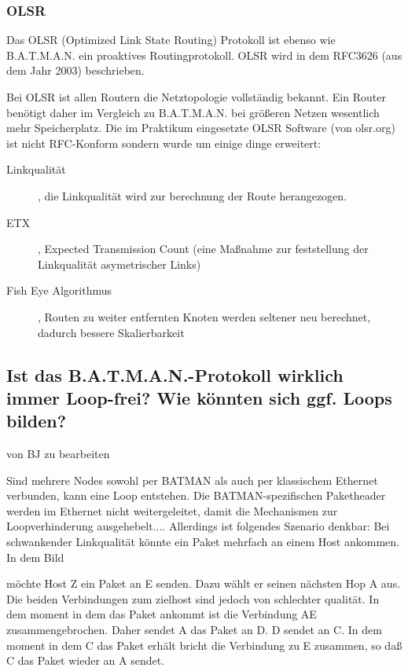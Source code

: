 \documentclass[a4paper,10pt]{article}
\begin{document}

\subsubsection*{OLSR}
Das OLSR (Optimized Link State Routing) Protokoll ist ebenso wie B.A.T.M.A.N. ein proaktives Routingprotokoll.
OLSR wird in dem RFC3626 (aus dem Jahr 2003) beschrieben.

Bei OLSR ist allen Routern die Netztopologie vollständig bekannt. Ein Router benötigt daher im Vergleich zu B.A.T.M.A.N. bei größeren
Netzen wesentlich mehr Speicherplatz.
Die im Praktikum eingesetzte OLSR Software (von olsr.org) ist nicht RFC-Konform sondern wurde um einige dinge erweitert:

\begin{description}
\item[Linkqualität], die Linkqualität wird zur berechnung der Route herangezogen.
\item[ETX], Expected Transmission Count (eine Maßnahme zur feststellung der Linkqualität asymetrischer Links)
\item[Fish Eye Algorithmus], Routen zu weiter entfernten Knoten werden seltener neu berechnet, dadurch bessere Skalierbarkeit
\end{description}

\subsection{Ist das B.A.T.M.A.N.-Protokoll wirklich immer Loop-frei? Wie könnten sich ggf. Loops bilden?}

von BJ zu bearbeiten

Sind mehrere Nodes sowohl per BATMAN als auch per klassischem Ethernet verbunden, kann eine Loop entstehen.
Die BATMAN-spezifischen Paketheader werden im Ethernet nicht weitergeleitet, damit die Mechanismen zur Loopverhinderung ausgehebelt....
 Allerdings ist folgendes Szenario denkbar:
Bei schwankender Linkqualität könnte ein Paket mehrfach an einem Host ankommen.
In dem Bild



möchte Host Z ein Paket an E senden. Dazu wählt er seinen nächsten Hop A aus.
Die beiden Verbindungen zum zielhost sind jedoch von schlechter qualität.
In dem moment in dem das Paket ankommt ist die Verbindung AE zusammengebrochen.
Daher sendet A das Paket an D.
D sendet an C.
In dem moment in dem C das Paket erhält bricht die Verbindung zu E zusammen, so daß C das Paket wieder an A sendet.
\end{document}
